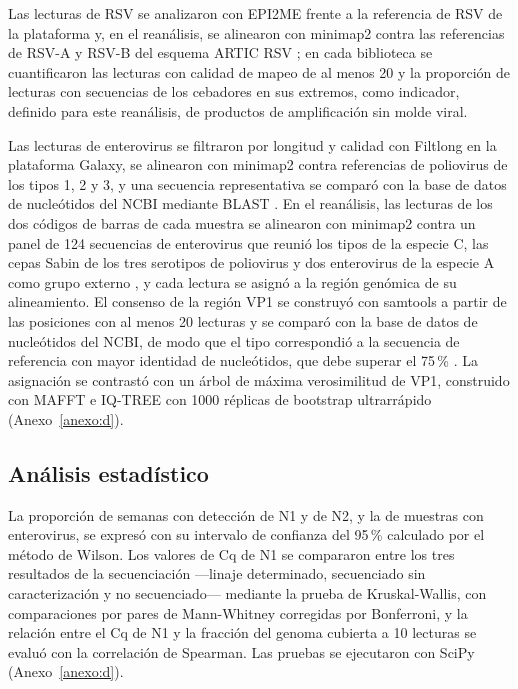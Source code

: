 Las lecturas de RSV se analizaron con EPI2ME frente a la referencia de RSV de la plataforma y, en el reanálisis, se alinearon con minimap2 contra las referencias de RSV-A y RSV-B del esquema ARTIC RSV \cite{Maloney_2025,Li_2018}; en cada biblioteca se cuantificaron las lecturas con calidad de mapeo de al menos 20 y la proporción de lecturas con secuencias de los cebadores en sus extremos, como indicador, definido para este reanálisis, de productos de amplificación sin molde viral.

Las lecturas de enterovirus se filtraron por longitud y calidad con Filtlong en la plataforma Galaxy, se alinearon con minimap2 contra referencias de poliovirus de los tipos 1, 2 y 3, y una secuencia representativa se comparó con la base de datos de nucleótidos del NCBI mediante BLAST \cite{Camacho_2009}. En el reanálisis, las lecturas de los dos códigos de barras de cada muestra se alinearon con minimap2 contra un panel de 124 secuencias de enterovirus que reunió los tipos de la especie C, las cepas Sabin de los tres serotipos de poliovirus y dos enterovirus de la especie A como grupo externo \cite{Li_2018}, y cada lectura se asignó a la región genómica de su alineamiento. El consenso de la región VP1 se construyó con samtools a partir de las posiciones con al menos 20 lecturas \cite{Danecek_2021} y se comparó con la base de datos de nucleótidos del NCBI, de modo que el tipo correspondió a la secuencia de referencia con mayor identidad de nucleótidos, que debe superar el 75\,\% \cite{Martin_2016}. La asignación se contrastó con un árbol de máxima verosimilitud de VP1, construido con MAFFT \cite{Katoh_2013} e IQ-TREE \cite{Minh_2020} con 1000 réplicas de bootstrap ultrarrápido (Anexo~\ref{anexo:d}).

\subsection{Análisis estadístico}

La proporción de semanas con detección de N1 y de N2, y la de muestras con enterovirus, se expresó con su intervalo de confianza del 95\,\% calculado por el método de Wilson. Los valores de Cq de N1 se compararon entre los tres resultados de la secuenciación —linaje determinado, secuenciado sin caracterización y no secuenciado— mediante la prueba de Kruskal-Wallis, con comparaciones por pares de Mann-Whitney corregidas por Bonferroni, y la relación entre el Cq de N1 y la fracción del genoma cubierta a 10 lecturas se evaluó con la correlación de Spearman. Las pruebas se ejecutaron con SciPy (Anexo~\ref{anexo:d}).

